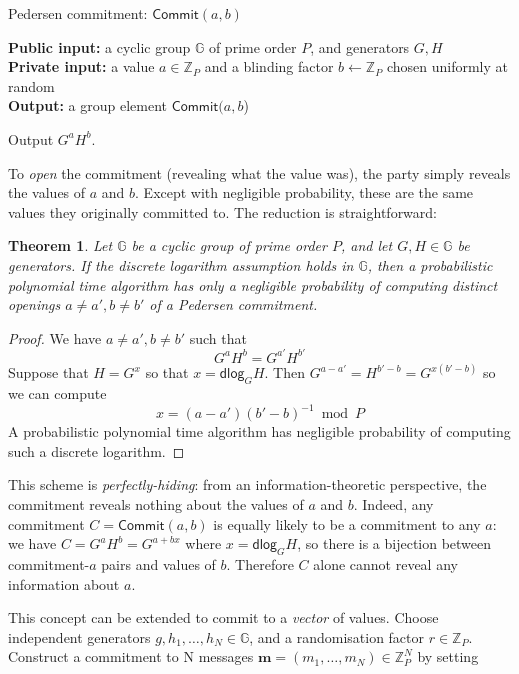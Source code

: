 \documentclass[12pt,a4paper]{article}
\newcommand{\dlog}{\mathsf{dlog}}
\newtheorem{theorem}{Theorem}
\theoremstyle{definition}
\begin{document}
\begin{algorithm}\caption{Pedersen commitment: $\mathsf{Commit}(a, b)$}\label{prot:Pedersen}
    \textbf{Public input:} a cyclic group $\mathbb{G}$ of prime order $P$, and generators $G, H$\\
    \textbf{Private input:} a value $a\in\mathbb{Z}_P$ and a blinding factor $b\gets\mathbb{Z}_P$ chosen uniformly at random\\
    \textbf{Output:} a group element $\mathsf{Commit}(a, b$)
    \begin{algorithmic}[1]
        \State Output $G^a H^b$.
    \end{algorithmic}
\end{algorithm}
To \textit{open} the commitment (revealing what the value was), the party simply reveals the values of $a$ and $b$. Except with negligible probability, these are the same values they originally committed to. The reduction is straightforward:
\begin{theorem}
    Let $\mathbb{G}$ be a cyclic group of prime order $P$, and let $G, H \in \mathbb{G}$ be generators. If the discrete logarithm assumption holds in $\mathbb{G}$, then a probabilistic polynomial time algorithm has only a negligible probability of computing distinct openings $a\neq a', b\neq b'$ of a Pedersen commitment.
\end{theorem}
\begin{proof}
    We have $a\neq a', b\neq b'$ such that
    $$G^a H^b = G^{a'} H^{b'}$$
    Suppose that $H = G^x$ so that $x = \dlog_G H$. Then $G^{a-a'} = H^{b' - b} = G^{x(b' - b)}$ so we can compute
        $$x = (a - a')(b' - b)^{-1} \bmod P$$
    A probabilistic polynomial time algorithm has negligible probability of computing such a discrete logarithm.
\end{proof}
This scheme is \textit{perfectly-hiding}: from an information-theoretic perspective, the commitment reveals nothing about the values of $a$ and $b$. Indeed, any commitment $C = \mathsf{Commit}(a, b)$ is equally likely to be a commitment to any $a$: we have $C = G^aH^b = G^{a + bx}$ where $x = \dlog_G H$, so there is a bijection between commitment-$a$ pairs and values of $b$. Therefore $C$ alone cannot reveal any information about $a$.

This concept can be extended to commit to a \textit{vector} of values. Choose independent generators $g, h_1, \ldots, h_N\in\mathbb{G}$, and a randomisation factor $r\in\mathbb{Z}_P$. Construct a commitment to N messages $\mathbf{m}=(m_1,\ldots,m_N)\in\mathbb{Z}_P^N$ by setting
\end{document}
